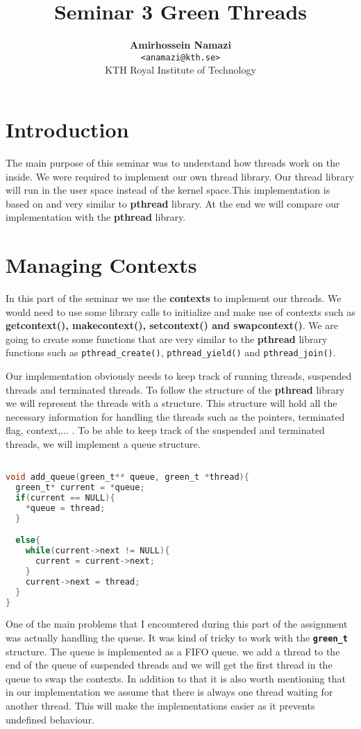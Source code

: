 \documentclass[a4paper,10pt]{article}
\title{\vspace{-1.5em}\textbf{Seminar 3 Green Threads}}
\author{{\textbf{Amirhossein Namazi}} \\
        {\texttt{<anamazi@kth.se>}} \\
        {KTH Royal Institute of Technology}}
\begin{document}
\maketitle

\section*{Introduction}
The main purpose of this seminar was to understand how threads work on the inside. We were required to implement our own thread library. Our thread library will run in the user space instead of the kernel space.This implementation is based on and very similar to \textbf{pthread} library. At the end we will compare our implementation with the \textbf{pthread} library.
\section*{Managing Contexts}
In this part of the seminar we use the \textbf{contexts} to implement our threads. We would need to use some library calls to initialize and make use of contexts such as \textbf{getcontext(), makecontext(), setcontext() and swapcontext()}.
We are going to create some functions that are very similar to the \textbf{pthread} library functions such as \texttt{pthread\_create()}, \texttt{pthread\_yield()} and \texttt{pthread\_join()}.

Our implementation obviously needs to keep track of running threads, suspended threads and terminated threads. To follow the structure of the \textbf{pthread} library we will represent the threads with a structure. This structure will hold all the necessary information for handling the threads such as the pointers, terminated flag, context,... .
To be able to keep track of the suspended and terminated threads, we will implement a queue structure.

\begin{lstlisting}[language=C]

void add_queue(green_t** queue, green_t *thread){
  green_t* current = *queue;
  if(current == NULL){
    *queue = thread;
  }

  else{
    while(current->next != NULL){
      current = current->next;
    }
    current->next = thread;
  }
}

\end{lstlisting}

One of the main problems that I encountered during this part of the assignment was actually handling the queue. It was kind of tricky to work with the\textbf{ \texttt{green\_t}} structure. The queue is implemented as a FIFO queue. we add a thread to the end of the queue of suspended threads and we will get the first thread in the queue to swap the contexts. In addition to that it is also worth mentioning that in our implementation we assume that there is always one thread waiting for another thread. This will make the implementations easier as it prevents undefined behaviour.
\end{document}
